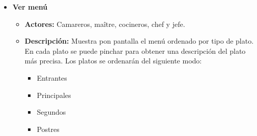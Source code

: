 \documentclass[spanish,a4paper,12pt]{report}		%
\begin{document}
\begin{itemize}
 	
	\item \textbf{Ver menú}
			\begin{itemize}
			\item \textbf{Actores:} Camareros, maître, cocineros, chef y jefe.
			\item \textbf{Descripción:} Muestra pon pantalla el menú ordenado por tipo de plato. En cada plato se puede pinchar para obtener una descripción del plato más precisa. Los platos se ordenarán del siguiente modo:
			\begin{itemize}
				\item 	 Entrantes
				\item 	 Principales
				\item 	 Segundos
				\item 	 Postres
				\end {itemize}
		\end {itemize}


\end{itemize}
\end{document}
